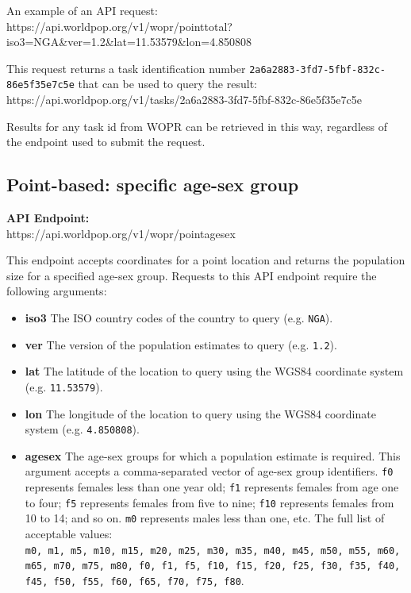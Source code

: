 \documentclass[]{book}
\begin{document}
An example of an API request:\\
https://api.worldpop.org/v1/wopr/pointtotal?iso3=NGA\&ver=1.2\&lat=11.53579\&lon=4.850808

This request returns a task identification number
\texttt{2a6a2883-3fd7-5fbf-832c-86e5f35e7c5e} that can be used to query
the result:\\
https://api.worldpop.org/v1/tasks/2a6a2883-3fd7-5fbf-832c-86e5f35e7c5e

Results for any task id from WOPR can be retrieved in this way,
regardless of the endpoint used to submit the request.

\subsection{Point-based: specific age-sex
group}\label{point-based-specific-age-sex-group}

\textbf{API Endpoint:}\\
https://api.worldpop.org/v1/wopr/pointagesex

This endpoint accepts coordinates for a point location and returns the
population size for a specified age-sex group. Requests to this API
endpoint require the following arguments:

\begin{itemize}
\item
  \textbf{iso3} The ISO country codes of the country to query (e.g.
  \texttt{NGA}).
\item
  \textbf{ver} The version of the population estimates to query (e.g.
  \texttt{1.2}).
\item
  \textbf{lat} The latitude of the location to query using the WGS84
  coordinate system (e.g. \texttt{11.53579}).
\item
  \textbf{lon} The longitude of the location to query using the WGS84
  coordinate system (e.g. \texttt{4.850808}).
\item
  \textbf{agesex} The age-sex groups for which a population estimate is
  required. This argument accepts a comma-separated vector of age-sex
  group identifiers. \texttt{f0} represents females less than one year
  old; \texttt{f1} represents females from age one to four; \texttt{f5}
  represents females from five to nine; \texttt{f10} represents females
  from 10 to 14; and so on. \texttt{m0} represents males less than one,
  etc. The full list of acceptable values:
  \texttt{m0,\ m1,\ m5,\ m10,\ m15,\ m20,\ m25,\ m30,\ m35,\ m40,\ m45,\ m50,\ m55,\ m60,\ m65,\ m70,\ m75,\ m80,\ f0,\ f1,\ f5,\ f10,\ f15,\ f20,\ f25,\ f30,\ f35,\ f40,\ f45,\ f50,\ f55,\ f60,\ f65,\ f70,\ f75,\ f80}.
\end{itemize}
\end{document}

